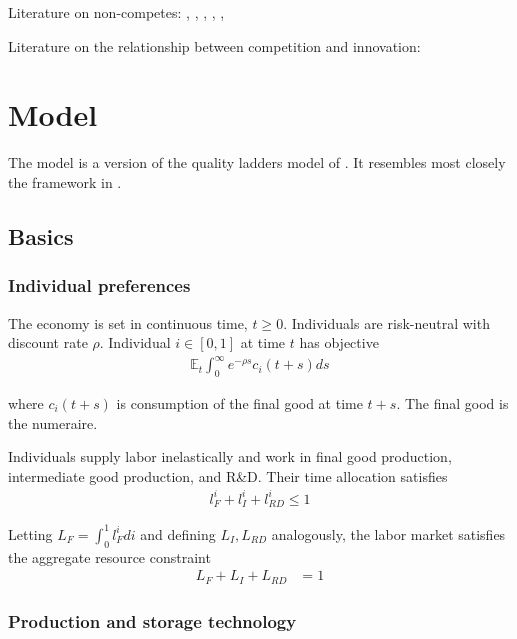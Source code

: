 \documentclass[12pt,english]{article}
\theoremstyle{remark}
\begin{document}
Literature on non-competes: \cite{saxenian_regional_1994}, \cite{gilson_legal_1999}, \cite{jeffers_impact_2018}, \cite{marx_mobility_2009}, \cite{marx_regional_2015}, \cite{starr_noncompetes_2019}

Literature on the relationship between competition and innovation: \cite{aghion_competition_2005}


\section{Model}\label{model}

The model is a version of the quality ladders model of \cite{grossman_quality_1991}. It resembles most closely the framework in \cite{akcigit_growth_2018}.  

\subsection{Basics}

\subsubsection{Individual preferences}

The economy is set in continuous time, $t \ge 0$. Individuals are risk-neutral with discount rate $\rho$. Individual $i \in [0,1]$ at time $t$ has objective
\begin{align*}
\mathbb{E}_t \int_0^{\infty} e^{-\rho s} c_i(t+s) ds
\end{align*}

where $c_i(t+s)$ is consumption of the final good at time $t+s$. The final good is the numeraire.

Individuals supply labor inelastically and work in final good production, intermediate good production, and R\&D. Their time allocation satisfies
\begin{align*}
l_F^i + l_I^i + l_{RD}^i \le 1
\end{align*}

Letting $L_F = \int_0^1 l_F^i di$ and defining $L_I,L_{RD}$ analogously, the labor market satisfies the aggregate resource constraint
\begin{align}
L_F + L_I + L_{RD} &= 1 \label{labor_resource_constraint}
\end{align}


\subsubsection{Production and storage technology}
\end{document}
